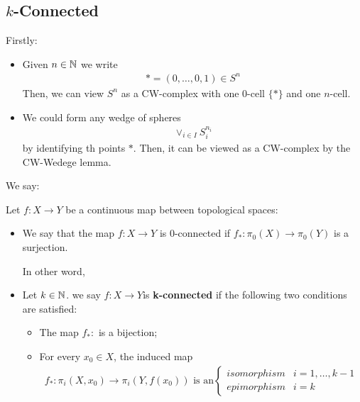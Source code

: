\documentclass[Total.tex]{subfiles}
\begin{document}
	\subsection{$k$-Connected}
	Firstly:
	\begin{itemize}
		\item Given $n\in \mathbb{N}$ we write
		\begin{gather*}
			*=(0,\dots,0,1)\in S^n
		\end{gather*}
		Then, we can view $S^n$ as a CW-complex with one $0$-cell $\{*\}$ and one $n$-cell.
		\item We could form any wedge of spheres
		\begin{gather*}
			\vee_{i\in I} S_i^{n_i}
		\end{gather*}
		by identifying th points $*$. Then, it can be viewed as a CW-complex by the CW-Wedege lemma.
	\end{itemize}
	We say:
	\begin{Def}
		Let $f:X\rightarrow Y$ be a continuous map between topological spaces:
		\begin{itemize}
			\item We say that the map $f:X\rightarrow Y$ is $0$-connected if $f_*:\pi_0(X)\rightarrow \pi_0(Y)$ is a surjection.
			
			In other word, 
			\item Let $k\in \mathbb{N}$. we say $f:X\rightarrow Y$is \textbf{k-connected} if the following two conditions are satisfied:
			\begin{itemize}
				\item The map $f_*:$ is a bijection;
				\item For every $x_0\in X$, the induced map 		
				\begin{gather*}
					f_*:\pi_i(X,x_0)\rightarrow \pi_i(Y,f(x_0))\mbox{ is an}\begin{cases}
						isomorphism&i=1,\dots,k-1\\
						epimorphism&i=k
					\end{cases}
				\end{gather*}
			\end{itemize}
		\end{itemize}
	\end{Def}
	
\end{document}
